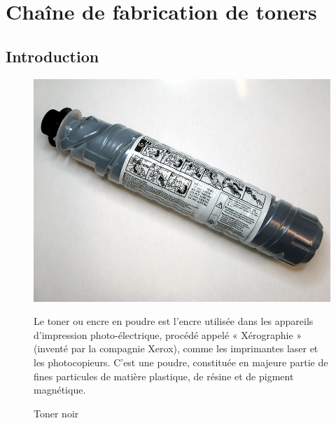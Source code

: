 \newpage

\section{Chaîne de fabrication de toners}


\subsection{Introduction}

\begin{figure}[htbp]
\begin{minipage}[c]{.35\linewidth}
\begin{center}
\includegraphics[width=0.9\linewidth]{img/toner.jpg}
\caption{Toner noir}
\label{fig:image8}
\end{center}
\end{minipage}
\hfill
\begin{minipage}[c]{.6\linewidth}
Le toner ou encre en poudre est l'encre utilisée dans les appareils d'impression photo-électrique, procédé appelé « Xérographie » (inventé par la compagnie Xerox), comme les imprimantes laser et les photocopieurs. C'est une poudre, constituée en majeure partie de fines particules de matière plastique, de résine et de pigment magnétique.
\end{minipage}
\end{figure}


